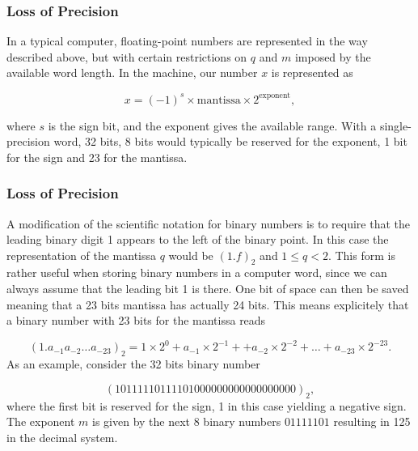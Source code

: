 \documentclass{beamer}
\newenvironment{block_mdfboxadmon}[1][]{\begin{block}{#1}}{\end{block}}
\begin{document}
\begin{frame}
\frametitle{Loss of Precision}

\begin{block_mdfboxadmon}
In a typical computer, floating-point numbers are represented
in the way described above, but with certain restrictions
on $q$ and $m$ imposed by the available word length.
In the machine, our
number $x$ is represented as

\begin{equation}
    x=(-1)^s\times {\mbox{mantissa}}\times 2^{{\mbox{exponent}}},
\end{equation}

where $s$ is the sign bit, and the exponent gives the available range.
With a single-precision word, 32 bits, 8 bits would typically be reserved
for the exponent,  1 bit for the sign and 23 for the mantissa.
\end{block_mdfboxadmon}
\end{frame}

\begin{frame}
\frametitle{Loss of Precision}

\begin{block_mdfboxadmon}
A modification of the scientific notation for binary numbers is to
require that the leading binary digit 1 appears to the left of the binary point.
In this case the representation of the mantissa $q$ would be
$(1.f)_2$ and $ 1 \le q < 2$. This form is rather useful when storing
binary numbers in a computer word, since we can always assume that the leading
bit 1 is there. One bit of space can then be saved meaning that a 23 bits
mantissa has actually 24 bits. This means explicitely that a binary number with 23 bits
for the mantissa reads

\begin{equation}
(1.a_{-1}a_{-2}\dots a_{-23})_2=1\times 2^0+a_{-1}\times 2^{-1}+
+a_{-2}\times 2^{-2}+\dots+a_{-23}\times 2^{-23}.
\end{equation}
As an example, consider the 32 bits binary number

\[
(10111110111101000000000000000000)_2,
\]
where the first bit is reserved for the sign, 1 in this case yielding a
negative sign. The exponent $m$ is given by the next 8 binary numbers
$01111101$ resulting in 125 in the decimal system.
\end{block_mdfboxadmon}
\end{frame}
\end{document}
